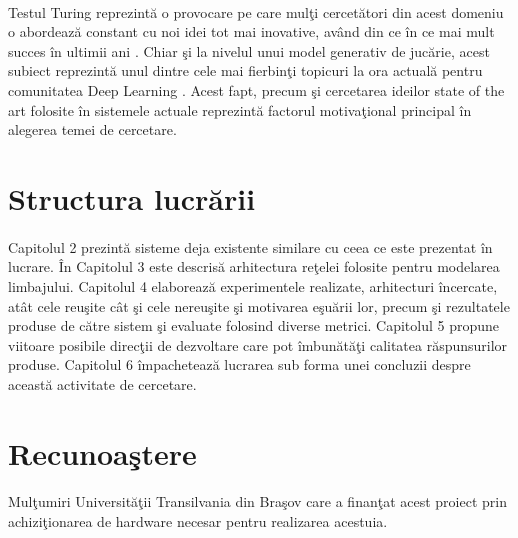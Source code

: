 \paragraph{}
Testul Turing reprezint\u a o provocare pe care mul\c ti cercet\u atori din acest domeniu o abordeaz\u a constant cu noi idei tot mai inovative, av\^ and din ce \^ in ce mai mult succes \^ in ultimii ani \cite{turing-test-succes}. Chiar \c si la nivelul unui model generativ de juc\u arie, acest subiect reprezint\u a unul dintre cele mai fierbin\c ti topicuri la ora actual\u a pentru comunitatea Deep Learning \cite{deep-learning-turing-test}. Acest fapt, precum \c si cercetarea ideilor state of the art folosite \^ in sistemele actuale reprezint\u a factorul motiva\c tional principal \^ in alegerea temei de cercetare.

\section{Structura lucr\u arii}

\paragraph{}
Capitolul 2 prezint\u a sisteme deja existente similare cu ceea ce este prezentat \^ in lucrare. \^ In Capitolul 3 este descris\u a arhitectura re\c telei folosite pentru modelarea limbajului. Capitolul 4 elaboreaz\u a experimentele realizate, arhitecturi \^ incercate, at\^ at cele reu\c site c\^ at \c si cele nereu\c site \c si motivarea e\c su\u arii lor, precum \c si rezultatele produse de c\u atre sistem \c si evaluate folosind diverse metrici. Capitolul 5 propune viitoare posibile direc\c tii de dezvoltare care pot \^ imbun\u at\u a\c ti calitatea r\u aspunsurilor produse. Capitolul 6 \^ impacheteaz\u a lucrarea sub forma unei concluzii despre aceast\u a activitate de cercetare.


\section{Recunoa\c stere}

\paragraph{}
Mul\c tumiri Universit\u a\c tii Transilvania din Bra\c sov care a finan\c tat acest proiect prin achizi\c tionarea de hardware necesar pentru realizarea acestuia.